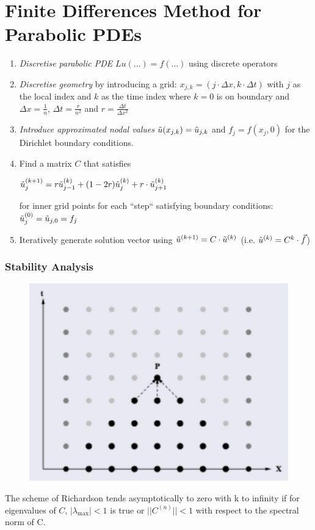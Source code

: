 \section{Finite Differences Method for Parabolic PDEs}


\begin{enumerate}
	\item \emph{Discretise parabolic PDE} $Lu(...) = f(...)$ using discrete operators
	\item{
		\emph{Discretise geometry} by introducing a grid:
		$x_{j,k} = (j\cdot\Delta x, k\cdot\Delta t)$ with $j$ as the local index
		and $k$ as the time index where $k=0$ is on boundary
		and \colorbox{shadecolor}{$\Delta x = \frac{1}{n}$},
		\colorbox{shadecolor}{$\Delta t = \frac{r}{n^2}$}
		and \colorbox{shadecolor}{$r = \frac{\Delta t}{\Delta x^2}$}
	}
	\item{
		\emph{Introduce approximated nodal values} $\tilde{u}(x_{j,k}) = \tilde{u}_{j,k}$ and $f_j = f(x_j,0)$ for the Dirichlet boundary conditions.
	}
	\item{
		Find a matrix $C$ that satisfies

		\colorbox{shadecolor}{$
			\displaystyle
			\tilde{u}_{j}^{(k+1)}=r\tilde{u}_{j-1}^{(k)}+(1-2r)\tilde{u}_{j}^{(k)} + r\cdot \tilde{u}_{j+1}^{(k)}
		$}

		for inner grid points for each ``step`` satisfying boundary conditions: $\tilde{u}_{j}^{(0)}=\tilde{u}_{j,0}=f_j$
	}
	\item{
		Iteratively generate solution vector using $\tilde{u}^{(k+1)}=C\cdot\tilde{u}^{(k)}$
		(i.e. $\tilde{u}^{(k)} = C^k\cdot \vec{f}$)
	}
\end{enumerate}

\subsubsection{Stability Analysis}

\begin{figure}
	\includegraphics[width=0.25\columnwidth]{images/richardsons}
\end{figure}

The scheme of Richardson tends asymptotically to zero with k to infinity if
for eigenvalues of $C$, $|\lambda_\mathrm{max}|<1$ is true or $||C^{(n)}||<1$ with respect to the spectral norm of C.

